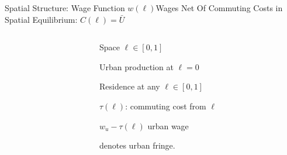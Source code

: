 \documentclass[aspectratio=169]{beamer}
\begin{document}

\begin{frame}{Spatial Structure: Wage Function $w(\ell)$}{Wages Net Of Commuting Costs in Spatial Equilibrium: $C(\ell) = \bar{U}$}
\begin{columns}
\begin{column}{0.7\textwidth}

\end{column}
\begin{column}{0.3\textwidth}
\begin{mide}
\item<1-> Space $\ell \in[0,1]$
\item<2-> Urban production at $\ell=0$
\item<2-> Residence at any $\ell \in[0,1]$
\item<3-> $\tau(\ell)$: commuting cost from $\ell$
\item<3-> $w_u - \tau(\ell)$ urban wage
\item<4-> {\color{red}{$\phi$}} denotes urban fringe.
\end{mide}
\end{column}
\end{columns}
\end{frame}
\end{document}
